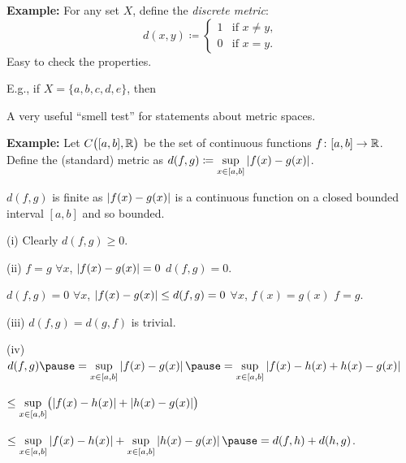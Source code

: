 \documentclass[10pt,aspectratio=169]{beamer}
\begin{document}
\begin{frame}

\textbf{Example:}
For any set $X$, define the \emph{discrete metric}:
\begin{equation*}
d(x,y) \coloneqq
\begin{cases}
1 & \text{if } x \not= y, \\
0 & \text{if } x = y.
\end{cases}
\end{equation*}
\pause
Easy to check the properties.

\pause
\medskip

E.g., if $X = \{ a,b,c,d,e \}$, then

\begin{center}
\end{center}

\pause
A very useful 
``smell test'' for statements about metric spaces.
\end{frame}

\begin{frame}

\textbf{Example:}
Let $C\bigl([a,b],{\mathbb{R}}\bigr)$ be the set of
continuous functions $f \colon [a,b] \to {\mathbb{R}}$.
\pause
Define the (standard) metric as
\qquad $
d(f,g) \coloneqq \sup\limits_{x \in [a,b]} \left\lvert {f(x)-g(x)} \right\rvert$.

\pause
\medskip

$d(f,g)$ is finite as $\left\lvert {f(x)-g(x)} \right\rvert$ is a continuous function on a closed bounded interval
$[a,b]$ and so bounded.

\pause
\medskip

(i) \quad Clearly $d(f,g) \geq 0$. 

\pause
\medskip

(ii) \quad $f = g$
\pause
\wthus $\forall x$, $\left\lvert {f(x)-g(x)} \right\rvert = 0$
\pause
\wthus $d(f,g) = 0$.

\pause
\phantom{(ii)}\quad
$d(f,g) = 0$
\pause
\hfill\thus\hfill $\forall x$, $\left\lvert {f(x)-g(x)} \right\rvert \leq d(f,g) = 0$
\pause
\hfill\thus\hfill
$\forall x$,
$f(x) = g(x)$
\pause
\hfill\thus\hfill
$f=g$.

\pause
\medskip

(iii) \quad $d(f,g) = d(g,f)$ is trivial.

\pause
\medskip

(iv)
\quad
$
d(f,g)
\pause
=
\sup\limits_{x \in [a,b]} \abs{f(x)-g(x)}
\pause
=
\sup\limits_{x \in [a,b]} \abs{f(x)-h(x)+h(x)-g(x)}
$

\pause
\medskip

\qquad
\qquad
$
\leq
\sup\limits_{x \in [a,b]} \bigl( \left\lvert {f(x)-h(x)} \right\rvert+\left\lvert {h(x)-g(x)} \right\rvert \bigr)
$

\pause
\medskip

\qquad
\qquad
$
\leq
\sup\limits_{x \in [a,b]} \abs{f(x)-h(x)}+
\sup\limits_{x \in [a,b]} \abs{h(x)-g(x)}
\pause
= d(f,h) + d(h,g)$.

\end{frame}
\end{document}
